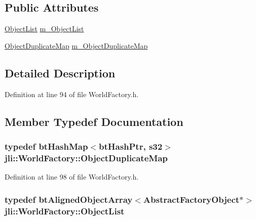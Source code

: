 \subsection*{Public Attributes}
\begin{DoxyCompactItemize}
\item 
\hyperlink{classjli_1_1_world_factory_ab7d8f835ed36ede3da410326c80709c8}{Object\+List} \hyperlink{classjli_1_1_world_factory_ac1a42314be66db6555d7723a35d2cdbc}{m\+\_\+\+Object\+List}
\item 
\hyperlink{classjli_1_1_world_factory_ac26bf6a5e096985680e8a45b33f7873c}{Object\+Duplicate\+Map} \hyperlink{classjli_1_1_world_factory_a67d271ea8de7eaee463069a9e3e46f4e}{m\+\_\+\+Object\+Duplicate\+Map}
\end{DoxyCompactItemize}


\subsection{Detailed Description}


Definition at line 94 of file World\+Factory.\+h.



\subsection{Member Typedef Documentation}
\hypertarget{classjli_1_1_world_factory_ac26bf6a5e096985680e8a45b33f7873c}{
\subsubsection[{Object\+Duplicate\+Map}]{\setlength{\rightskip}{0pt plus 5cm}typedef bt\+Hash\+Map$<$bt\+Hash\+Ptr, s32$>$ {\bf jli\+::\+World\+Factory\+::\+Object\+Duplicate\+Map}}}\label{classjli_1_1_world_factory_ac26bf6a5e096985680e8a45b33f7873c}


Definition at line 98 of file World\+Factory.\+h.

\hypertarget{classjli_1_1_world_factory_ab7d8f835ed36ede3da410326c80709c8}{
\subsubsection[{Object\+List}]{\setlength{\rightskip}{0pt plus 5cm}typedef bt\+Aligned\+Object\+Array$<${\bf Abstract\+Factory\+Object}$\ast$$>$ {\bf jli\+::\+World\+Factory\+::\+Object\+List}}}\label{classjli_1_1_world_factory_ab7d8f835ed36ede3da410326c80709c8}


